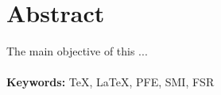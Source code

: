 \chapter*{Abstract}




The main objective of this ...
\\
\\
{\large\textbf{Keywords:}}
TeX, LaTeX, PFE, SMI, FSR

